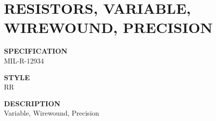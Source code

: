 \section{RESISTORS, VARIABLE, WIREWOUND, PRECISION}

\begin{minipage}[t]{0.24\textwidth}
    \textbf{SPECIFICATION}\\
    MIL-R-12934
\end{minipage}
\hfill
\begin{minipage}[t]{0.12\textwidth}
    \textbf{STYLE}\\
    RR
\end{minipage}
\hfill
\begin{minipage}[t]{0.61\textwidth}
    \textbf{DESCRIPTION}\\
    Variable, Wirewound, Precision
\end{minipage}

